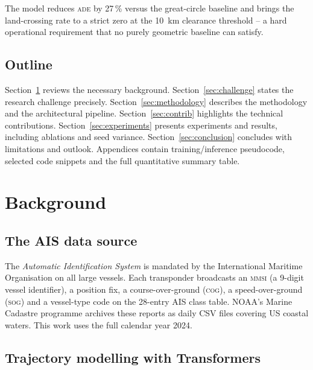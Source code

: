 \documentclass[11pt,a4paper]{article}
\newcommand{\ade}{\textsc{ade}}
\begin{document}
The model reduces \ade{} by 27\,\% versus the great-circle baseline and
brings the land-crossing rate to a strict zero at the 10~km clearance
threshold -- a hard operational requirement that no purely geometric
baseline can satisfy.

\subsection{Outline}

Section~\ref{sec:background} reviews the necessary background.
Section~\ref{sec:challenge} states the research challenge precisely.
Section~\ref{sec:methodology} describes the methodology and the
architectural pipeline.
Section~\ref{sec:contrib} highlights the technical contributions.
Section~\ref{sec:experiments} presents experiments and results,
including ablations and seed variance.
Section~\ref{sec:conclusion} concludes with limitations and outlook.
Appendices contain training/inference pseudocode, selected code
snippets and the full quantitative summary table.

\section{Background}\label{sec:background}

\subsection{The AIS data source}

The \emph{Automatic Identification System} is mandated by the
International Maritime Organisation on all large vessels.  Each
transponder broadcasts an \textsc{mmsi} (a 9-digit vessel identifier),
a position fix, a course-over-ground (\textsc{cog}), a speed-over-ground
(\textsc{sog}) and a vessel-type code on the 28-entry AIS class table.
NOAA's Marine Cadastre programme archives these reports as daily CSV
files covering US coastal waters.  This work uses the full calendar year
2024.

\subsection{Trajectory modelling with Transformers}
\end{document}
